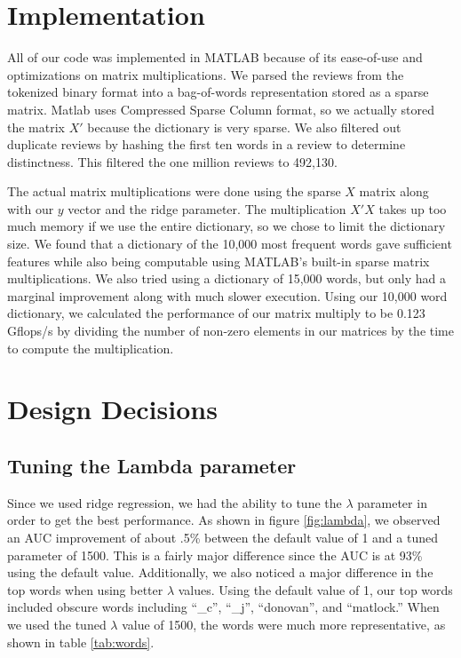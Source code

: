 \documentclass{article}
\begin{document}

\section{Implementation}
All of our code was implemented in MATLAB because of its ease-of-use and optimizations on matrix multiplications. We parsed the reviews from the tokenized binary format into a bag-of-words representation stored as a sparse matrix. Matlab uses Compressed Sparse Column format, so we actually stored the matrix $X'$ because the dictionary is very sparse. We also filtered out duplicate reviews by hashing the first ten words in a review to determine distinctness. This filtered the one million reviews to 492,130.


The actual matrix multiplications were done using the sparse $X$ matrix along with our $y$ vector and the ridge parameter. The multiplication $X'X$ takes up too much memory if we use the entire dictionary, so we chose to limit the dictionary size. We found that a dictionary of the 10,000 most frequent words gave sufficient features while also being computable using MATLAB's built-in sparse matrix multiplications. We also tried using a dictionary of 15,000 words, but only had a marginal improvement along with much slower execution. Using our 10,000 word dictionary, we calculated the performance of our matrix multiply to be 0.123 Gflops/s by dividing the number of non-zero elements in our matrices by the time to compute the multiplication.

\section{Design Decisions}

\subsection{Tuning the Lambda parameter}
Since we used ridge regression, we had the ability to tune the $\lambda$ parameter in order to get the best performance. As shown in figure \ref{fig:lambda}, we observed an AUC improvement of about .5\% between the default value of 1 and a tuned parameter of 1500. This is a fairly major difference since the AUC is at 93\% using the default value. Additionally, we also noticed a major difference in the top words when using better $\lambda$ values. Using the default value of 1, our top words included obscure words including ``\_c'', ``\_j'', ``donovan'', and ``matlock.'' When we used the tuned $\lambda$ value of 1500, the words were much more representative, as shown in table \ref{tab:words}.
\end{document}
